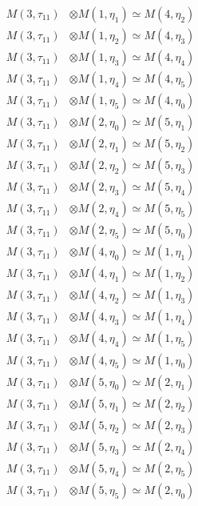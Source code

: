 \begin{align*}
M(3,\tau_{11}) &\otimes M(1,\eta_{1}) \simeq M(4,\eta_{2}) \\
M(3,\tau_{11}) &\otimes M(1,\eta_{2}) \simeq M(4,\eta_{3}) \\
M(3,\tau_{11}) &\otimes M(1,\eta_{3}) \simeq M(4,\eta_{4}) \\
M(3,\tau_{11}) &\otimes M(1,\eta_{4}) \simeq M(4,\eta_{5}) \\
M(3,\tau_{11}) &\otimes M(1,\eta_{5}) \simeq M(4,\eta_{0}) \\
M(3,\tau_{11}) &\otimes M(2,\eta_{0}) \simeq M(5,\eta_{1}) \\
M(3,\tau_{11}) &\otimes M(2,\eta_{1}) \simeq M(5,\eta_{2}) \\
M(3,\tau_{11}) &\otimes M(2,\eta_{2}) \simeq M(5,\eta_{3}) \\
M(3,\tau_{11}) &\otimes M(2,\eta_{3}) \simeq M(5,\eta_{4}) \\
M(3,\tau_{11}) &\otimes M(2,\eta_{4}) \simeq M(5,\eta_{5}) \\
M(3,\tau_{11}) &\otimes M(2,\eta_{5}) \simeq M(5,\eta_{0}) \\
M(3,\tau_{11}) &\otimes M(4,\eta_{0}) \simeq M(1,\eta_{1}) \\
M(3,\tau_{11}) &\otimes M(4,\eta_{1}) \simeq M(1,\eta_{2}) \\
M(3,\tau_{11}) &\otimes M(4,\eta_{2}) \simeq M(1,\eta_{3}) \\
M(3,\tau_{11}) &\otimes M(4,\eta_{3}) \simeq M(1,\eta_{4}) \\
M(3,\tau_{11}) &\otimes M(4,\eta_{4}) \simeq M(1,\eta_{5}) \\
M(3,\tau_{11}) &\otimes M(4,\eta_{5}) \simeq M(1,\eta_{0}) \\
M(3,\tau_{11}) &\otimes M(5,\eta_{0}) \simeq M(2,\eta_{1}) \\
M(3,\tau_{11}) &\otimes M(5,\eta_{1}) \simeq M(2,\eta_{2}) \\
M(3,\tau_{11}) &\otimes M(5,\eta_{2}) \simeq M(2,\eta_{3}) \\
M(3,\tau_{11}) &\otimes M(5,\eta_{3}) \simeq M(2,\eta_{4}) \\
M(3,\tau_{11}) &\otimes M(5,\eta_{4}) \simeq M(2,\eta_{5}) \\
M(3,\tau_{11}) &\otimes M(5,\eta_{5}) \simeq M(2,\eta_{0}) \\
\end{align*}

